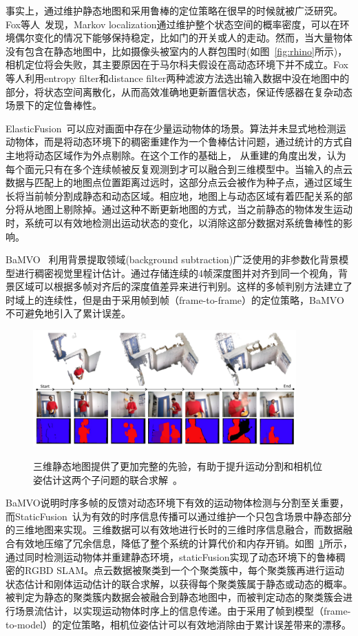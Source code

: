 事实上，通过维护静态地图和采用鲁棒的定位策略在很早的时候就被广泛研究。Fox等人~\cite{fox1999}发现，Markov localization通过维护整个状态空间的概率密度，可以在环境偶尔变化的情况下能够保持稳定，比如门的开关或人的走动。然而，当大量物体没有包含在静态地图中，比如摄像头被室内的人群包围时(如图~\ref{fig:rhino}所示)，相机定位将会失败，其主要原因在于马尔科夫假设在高动态环境下并不成立。Fox等人利用entropy filter和distance filter两种滤波方法选出输入数据中没在地图中的部分，将状态空间离散化，从而高效准确地更新置信状态，保证传感器在复杂动态场景下的定位鲁棒性。

ElasticFusion~\cite{elasticFusion}可以应对画面中存在少量运动物体的场景。算法并未显式地检测运动物体，而是将动态环境下的稠密重建作为一个鲁棒估计问题，通过统计的方式自主地将动态区域作为外点剔除。在这个工作的基础上，\cite{keller13_3dv} 从重建的角度出发，认为每个面元只有在多个连续帧被反复观测到才可以融合到三维模型中。当输入的点云数据与匹配上的地图点位置距离过远时，这部分点云会被作为种子点，通过区域生长将当前帧分割成静态和动态区域。相应地，地图上与动态区域有着匹配关系的部分将从地图上剔除掉。通过这种不断更新地图的方式，当之前静态的物体发生运动时，系统可以有效地检测出运动状态的变化，以消除这部分数据对系统鲁棒性的影响。

BaMVO~\cite{BaMVO} 利用背景提取领域(background subtraction)广泛使用的非参数化背景模型进行稠密视觉里程计估计。通过存储连续的4帧深度图并对齐到同一个视角，背景区域可以根据多帧对齐后的深度值差异来进行判别。这样的多帧判别方法建立了时域上的连续性，但是由于采用帧到帧（frame-to-frame）的定位策略，BaMVO不可避免地引入了累计误差。

\begin{figure}[!htbp]
	\centering
	\includegraphics[width=0.9\textwidth]{figs/2-1/staticFusion.jpeg}
	\label{fig:staticFusion}
	\caption{三维静态地图提供了更加完整的先验，有助于提升运动分割和相机位姿估计这两个子问题的联合求解~\cite{staticFusion}。}
\end{figure}

BaMVO说明时序多帧的反馈对动态环境下有效的运动物体检测与分割至关重要，而StaticFusion~\cite{staticFusion}认为有效的时序信息传播可以通过维护一个只包含场景中静态部分的三维地图来实现。三维数据可以有效地进行长时的三维时序信息融合，而数据融合有效地压缩了冗余信息，降低了整个系统的计算代价和内存开销。如图~\ref{fig:staticFusion}所示，通过同时检测运动物体并重建静态环境，staticFusion实现了动态环境下的鲁棒稠密的RGBD SLAM。点云数据被聚类到一个个聚类簇中，每个聚类簇再进行运动状态估计和刚体运动估计的联合求解，以获得每个聚类簇属于静态或动态的概率。被判定为静态的聚类簇内数据会被融合到静态地图中，而被判定动态的聚类簇会进行场景流估计，以实现运动物体时序上的信息传递。由于采用了帧到模型（frame-to-model）的定位策略，相机位姿估计可以有效地消除由于累计误差带来的漂移。

